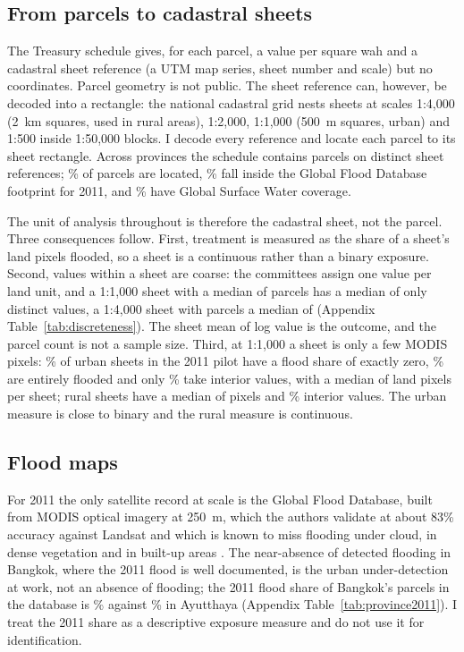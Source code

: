 \subsection{From parcels to cadastral sheets}

The Treasury schedule gives, for each parcel, a value per square wah and a cadastral sheet reference (a UTM map series, sheet number and scale) but no coordinates. Parcel geometry is not public. The sheet reference can, however, be decoded into a rectangle: the national cadastral grid nests sheets at scales 1:4,000 (2~km squares, used in rural areas), 1:2,000, 1:1,000 (500~m squares, urban) and 1:500 inside 1:50,000 blocks. I decode every reference and locate each parcel to its sheet rectangle. Across \covProvinces{} provinces the schedule contains \covParcels{} parcels on \covSheetRefs{} distinct sheet references; \covLocated\% of parcels are located, \covGfd\% fall inside the Global Flood Database footprint for 2011, and \covGsw\% have Global Surface Water coverage.

The unit of analysis throughout is therefore the cadastral sheet, not the parcel. Three consequences follow. First, treatment is measured as the share of a sheet's land pixels flooded, so a sheet is a continuous rather than a binary exposure. Second, values within a sheet are coarse: the committees assign one value per land unit, and a 1:1,000 sheet with a median of \discParcelsOneK{} parcels has a median of only \discDistinctOneK{} distinct values, a 1:4,000 sheet with \discParcelsFourK{} parcels a median of \discDistinctFourK{} (Appendix Table~\ref{tab:discreteness}). The sheet mean of log value is the outcome, and the parcel count is not a sample size. Third, at 1:1,000 a sheet is only a few MODIS pixels: \supZeroOneK\% of urban sheets in the 2011 pilot have a flood share of exactly zero, \supOneOneK\% are entirely flooded and only \supInteriorOneK\% take interior values, with a median of \supPxOneK{} land pixels per sheet; rural sheets have a median of \supPxFourK{} pixels and \supInteriorFourK\% interior values. The urban measure is close to binary and the rural measure is continuous.

\subsection{Flood maps}

For 2011 the only satellite record at scale is the Global Flood Database, built from MODIS optical imagery at 250~m, which the authors validate at about 83\% accuracy against Landsat and which is known to miss flooding under cloud, in dense vegetation and in built-up areas \citep{tellman2021satellite}. The near-absence of detected flooding in Bangkok, where the 2011 flood is well documented, is the urban under-detection at work, not an absence of flooding; the 2011 flood share of Bangkok's parcels in the database is \provBangkok\% against \provAyutthaya\% in Ayutthaya (Appendix Table~\ref{tab:province2011}). I treat the 2011 share as a descriptive exposure measure and do not use it for identification.

